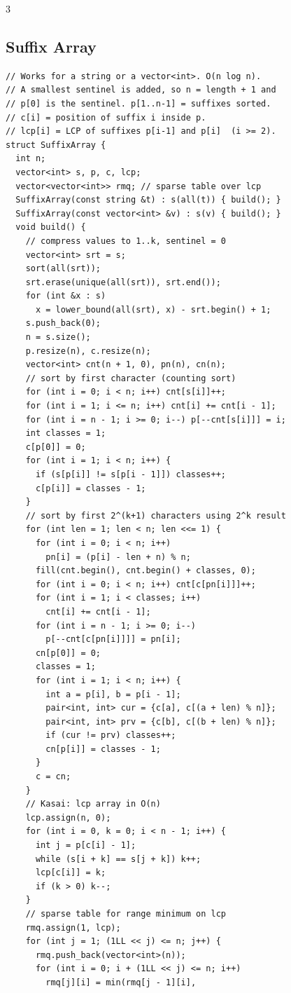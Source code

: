 \documentclass[8pt, a4paper]{article}
\begin{document}
\begin{multicols*}{3}
\subsection{Suffix Array}
\begin{lstlisting}
// Works for a string or a vector<int>. O(n log n).
// A smallest sentinel is added, so n = length + 1 and
// p[0] is the sentinel. p[1..n-1] = suffixes sorted.
// c[i] = position of suffix i inside p.
// lcp[i] = LCP of suffixes p[i-1] and p[i]  (i >= 2).
struct SuffixArray {
  int n;
  vector<int> s, p, c, lcp;
  vector<vector<int>> rmq; // sparse table over lcp
  SuffixArray(const string &t) : s(all(t)) { build(); }
  SuffixArray(const vector<int> &v) : s(v) { build(); }
  void build() {
    // compress values to 1..k, sentinel = 0
    vector<int> srt = s;
    sort(all(srt));
    srt.erase(unique(all(srt)), srt.end());
    for (int &x : s)
      x = lower_bound(all(srt), x) - srt.begin() + 1;
    s.push_back(0);
    n = s.size();
    p.resize(n), c.resize(n);
    vector<int> cnt(n + 1, 0), pn(n), cn(n);
    // sort by first character (counting sort)
    for (int i = 0; i < n; i++) cnt[s[i]]++;
    for (int i = 1; i <= n; i++) cnt[i] += cnt[i - 1];
    for (int i = n - 1; i >= 0; i--) p[--cnt[s[i]]] = i;
    int classes = 1;
    c[p[0]] = 0;
    for (int i = 1; i < n; i++) {
      if (s[p[i]] != s[p[i - 1]]) classes++;
      c[p[i]] = classes - 1;
    }
    // sort by first 2^(k+1) characters using 2^k result
    for (int len = 1; len < n; len <<= 1) {
      for (int i = 0; i < n; i++)
        pn[i] = (p[i] - len + n) % n;
      fill(cnt.begin(), cnt.begin() + classes, 0);
      for (int i = 0; i < n; i++) cnt[c[pn[i]]]++;
      for (int i = 1; i < classes; i++)
        cnt[i] += cnt[i - 1];
      for (int i = n - 1; i >= 0; i--)
        p[--cnt[c[pn[i]]]] = pn[i];
      cn[p[0]] = 0;
      classes = 1;
      for (int i = 1; i < n; i++) {
        int a = p[i], b = p[i - 1];
        pair<int, int> cur = {c[a], c[(a + len) % n]};
        pair<int, int> prv = {c[b], c[(b + len) % n]};
        if (cur != prv) classes++;
        cn[p[i]] = classes - 1;
      }
      c = cn;
    }
    // Kasai: lcp array in O(n)
    lcp.assign(n, 0);
    for (int i = 0, k = 0; i < n - 1; i++) {
      int j = p[c[i] - 1];
      while (s[i + k] == s[j + k]) k++;
      lcp[c[i]] = k;
      if (k > 0) k--;
    }
    // sparse table for range minimum on lcp
    rmq.assign(1, lcp);
    for (int j = 1; (1LL << j) <= n; j++) {
      rmq.push_back(vector<int>(n));
      for (int i = 0; i + (1LL << j) <= n; i++)
        rmq[j][i] = min(rmq[j - 1][i],

\end{lstlisting}
\end{multicols*}
\end{document}
